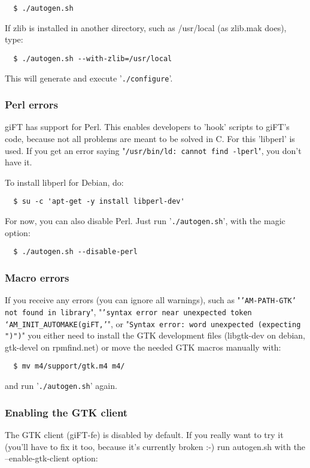 \documentclass[10pt]{article}
\begin{document}
\begin{verbatim}
  $ ./autogen.sh
\end{verbatim}

If zlib is installed in another directory, such as /usr/local (as
zlib.mak does), type:

\begin{verbatim}
  $ ./autogen.sh --with-zlib=/usr/local
\end{verbatim}

This will generate and execute '\verb|./configure|'.

\subsubsection{Perl errors}
giFT has support for Perl. This enables developers to 'hook'
scripts to giFT's code, because not all problems are meant to be
solved in C.  For this 'libperl' is used. If you get an error
saying "\texttt{/usr/bin/ld: cannot find -lperl}", you don't have
it.

To install libperl for Debian, do:

\begin{verbatim}
  $ su -c 'apt-get -y install libperl-dev'
\end{verbatim}

For now, you can also disable Perl. Just run '\verb|./autogen.sh|',
with the magic option:

\begin{verbatim}
  $ ./autogen.sh --disable-perl
\end{verbatim}

\subsubsection{Macro errors}
If you receive any errors (you can ignore all warnings), such as
"\texttt{'AM-PATH-GTK' not found in library}", "\texttt{'syntax
error near unexpected token `AM\_INIT\_AUTOMAKE(giFT,'}", or
"\texttt{Syntax error: word unexpected (expecting ")")}" you
either need to install the GTK development files (libgtk-dev on
debian, gtk-devel on rpmfind.net) or move the needed GTK macros
manually with:

\begin{verbatim}
  $ mv m4/support/gtk.m4 m4/
\end{verbatim}

and run '\texttt{./autogen.sh}' again.

\subsubsection{Enabling the GTK client}
The GTK client (giFT-fe) is disabled by default. If you really
want to try it (you'll have to fix it too, because it's currently
broken :-) run autogen.sh with the --enable-gtk-client option:
\end{document}
